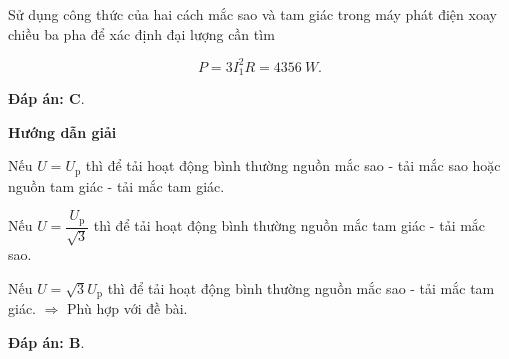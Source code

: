 \begin{dang}{Sử dụng công thức của hai cách mắc sao và tam giác trong máy phát điện xoay chiều ba pha để xác định đại lượng cần tìm}
{		$$P = 3I_1^2 R =\SI{4356}{W}.$$
		
		\textbf{Đáp án: C}.
	}
	{	\begin{center}
			\textbf{Hướng dẫn giải}
		\end{center}
		
		Nếu $U = U_\text{p}$ thì để tải hoạt động bình thường nguồn mắc sao  - tải mắc sao hoặc nguồn tam giác  - tải mắc tam giác.
		
		Nếu $U = \dfrac{U_\text{p}}{\sqrt 3}$ thì để tải hoạt động bình thường nguồn mắc tam giác  - tải mắc sao.
		
		Nếu $U = \sqrt 3 U_\text{p}$ thì để tải hoạt động bình thường nguồn mắc sao  - tải mắc tam giác. $\Rightarrow$ Phù hợp với đề bài.
				
		\textbf{Đáp án: B}.
	}
\end{dang}



